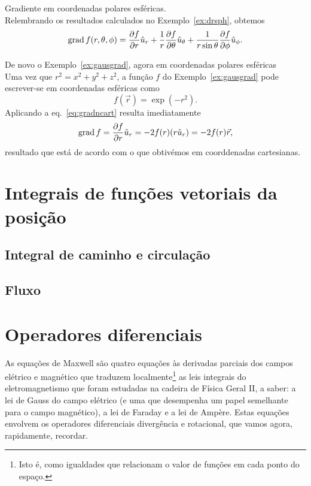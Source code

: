\begin{examples}
\item Gradiente em coordenadas polares esféricas.\\
Relembrando os resultados calculados no Exemplo~\ref{ex:drsph}, obtemos
\begin{equation*}
\text{grad}\, f(r,\theta,\phi)=\frac{\partial f}{\partial r}\hat u_r+\frac{1}{r}\frac{\partial f}{\partial \theta}\hat u_\theta
+\frac{1}{r\sin\theta}\frac{\partial f}{\partial \phi}\hat u_\phi.
\end{equation*}

\item De novo o Exemplo~\ref{ex:gausgrad}, agora em coordenadas polares
esféricas\\
Uma vez que $r^2=x^2+y^2+z^2$, a função $f$ do Exemplo~\ref{ex:gausgrad} pode
escrever-se em coordenadas esféricas como
\begin{equation*}
f(\vec r)=\exp(-r^2).
\end{equation*}
Aplicando a eq.~\eqref{eq:gradncart} resulta imediatamente
\begin{equation*}
\grad f=\pd{f}{r}\hat u_r=-2f(r)(r\hat u_r)=-2f(r)\vec r,
\end{equation*}
resultado que está de acordo com o que obtivémos em coorddenadas cartesianas.
\end{examples}

\section{Integrais de funções vetoriais da posição}

\subsection{Integral de caminho e circulação}

\subsection{Fluxo}

\section{Operadores diferenciais}
As equações de Maxwell são quatro equações às derivadas parciais dos campos
elétrico e magnético que traduzem localmente\footnote{Isto é, como igualdades
que relacionam o valor de funções em cada ponto do espaço.} as leis integrais
do eletromagnetismo que foram estudadas na cadeira de Física Geral II, a saber:
a lei de Gauss do campo elétrico (e uma que desempenha um papel semelhante para
o campo magnético), a lei de Faraday e a lei de Ampère. Estas equações envolvem
os operadores diferenciais divergência e rotacional, que vamos agora,
rapidamente, recordar.


